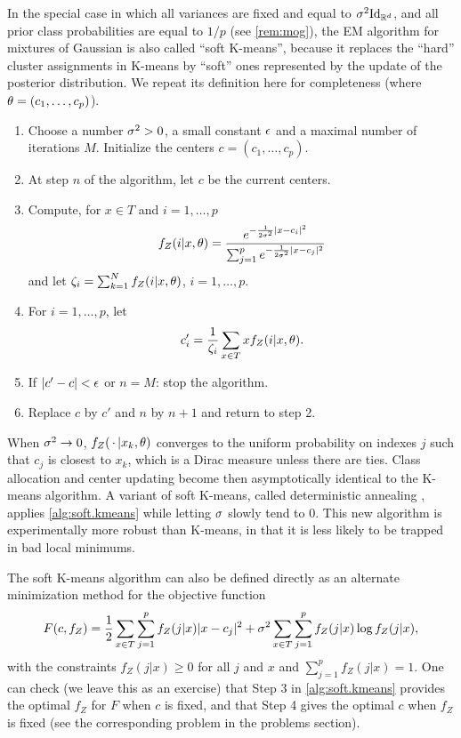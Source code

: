 In the special case in which all variances are fixed and equal to  $\sig^2\Id[d]$, and all prior class probabilities are equal to $1/p$ (see \cref{rem:mog}), the EM algorithm for mixtures of Gaussian is also called ``soft K-means'', because it replaces the ``hard'' cluster assignments in K-means by ``soft'' ones represented by the update of the posterior distribution. We repeat its definition here for completeness (where $\theta = (c_1, \ldots, c_p)$).
\begin{algorithm}
\label{alg:soft.kmeans}
\begin{enumerate}[label=\arabic*., wide=0.5cm]
\item Choose a number $\sigma^2>0$, a small constant $\epsilon$ and a maximal number of iterations $M$. Initialize the  centers  $c = (c_1, \ldots, c_p)$. 
\item At step $n$ of the algorithm, let $c$ be the current centers. 
\item Compute, for $x\in T$ and $i=1, \ldots, p$
\[
f_Z(i|x, \theta) = \frac{e^{- \frac1{2\sigma^2} 
|x-c_i|^2}}{\sum_{j=1}^p e^{-\frac1{2\sigma^2}
|x-c_j|^2}}
\]
and let $\zeta_i = \sum_{k=1}^N f_Z(i|x, \theta)$, $i=1, \ldots, p$.
\item For $i=1, \ldots, p$, let 
\[
c'_i = \frac{1}{\zeta_i}\sum_{x\in T} x f_Z(i|x, \theta).
\]
\item If $|c' - c| <\epsilon$ or $n=M$: stop the algorithm.
\item Replace $c$ by $c'$ and $n$ by $n+1$ and return to step 2. 
\end{enumerate}
\end{algorithm}

When $\sigma^2\to 0$, $f_Z(\,\cdot\,|x_k, \theta)$ converges to the uniform probability on indexes $j$ such that $c_j$ is closest to $x_k$, which is a Dirac measure unless there are ties. Class allocation and center
updating become then asymptotically identical to the K-means algorithm. 
A variant of soft K-means, called deterministic annealing \cite{rose1990deterministic}, applies \cref{alg:soft.kmeans} while letting $\sigma$ slowly tend to 0. This new algorithm is experimentally more robust than K-means, in that it is less likely to be trapped in bad local minimums.

\begin{remark}
\label{rem:soft.kmeans}
The soft K-means algorithm can also be defined directly as an alternate minimization method for the objective function
\[
F(c, f_Z) = \frac12 \sum_{x\in T} \sum_{j=1}^p f_Z(j|x) |x- c_j|^2 + \sigma^2 \sum_{x\in T}
\sum_{j=1}^p f_Z(j|x)\log f_Z(j|x),
\]
with the constraints $f_Z(j|x) \geq 0$ for all $j$ and $x$ and $\sum_{j=1}^p f_Z(j|x) = 1$. One can check (we leave this as an exercise) that Step 3 in \cref{alg:soft.kmeans} provides the optimal $f_Z$ for $F$ when $c$ is fixed, and that Step 4 gives the optimal $c$ when $f_Z$ is fixed (see the corresponding problem in the problems section).
\end{remark}

